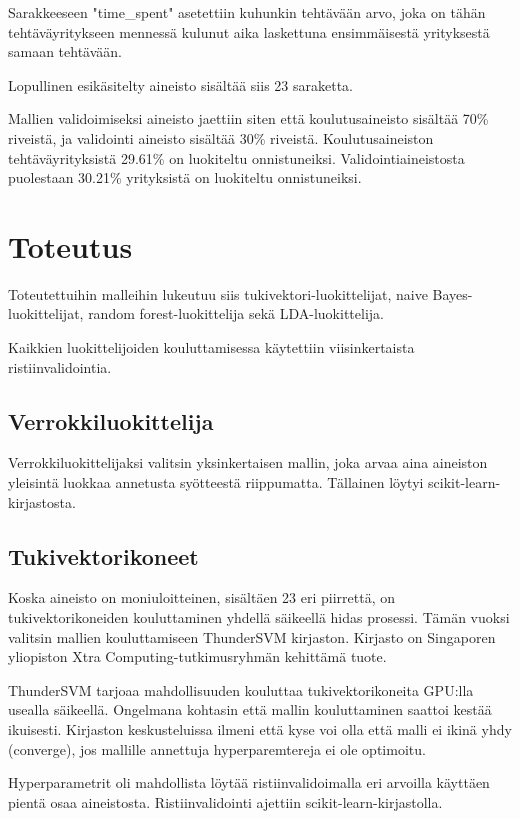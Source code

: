 \documentclass[finnish,twoside,openright]{HYgraduMLDS}
\begin{document}
Sarakkeeseen "time\_spent" asetettiin kuhunkin tehtävään arvo, joka on tähän tehtäväyritykseen mennessä kulunut aika laskettuna ensimmäisestä yrityksestä samaan tehtävään.

Lopullinen esikäsitelty aineisto sisältää siis 23 saraketta.

Mallien validoimiseksi aineisto jaettiin siten että koulutusaineisto sisältää 70\% riveistä, ja validointi aineisto sisältää 30\% riveistä. Koulutusaineiston tehtäväyrityksistä 29.61\% on luokiteltu onnistuneiksi. Validointiaineistosta puolestaan 30.21\% yrityksistä on luokiteltu onnistuneiksi.


\section{Toteutus}

Toteutettuihin malleihin lukeutuu siis tukivektori-luokittelijat, naive Bayes-luokittelijat, random forest-luokittelija sekä LDA-luokittelija.

Kaikkien luokittelijoiden kouluttamisessa käytettiin viisinkertaista ristiinvalidointia.

\subsection{Verrokkiluokittelija}

Verrokkiluokittelijaksi valitsin yksinkertaisen mallin, joka arvaa aina aineiston yleisintä luokkaa annetusta syötteestä riippumatta. Tällainen löytyi scikit-learn\cite{scikit-learn}-kirjastosta.


\subsection{Tukivektorikoneet}

Koska aineisto on moniuloitteinen, sisältäen 23 eri piirrettä, on tukivektorikoneiden kouluttaminen yhdellä säikeellä hidas prosessi. Tämän vuoksi valitsin mallien kouluttamiseen ThunderSVM\cite{wenthundersvm18} kirjaston. Kirjasto on Singaporen yliopiston Xtra Computing-tutkimusryhmän kehittämä tuote.

ThunderSVM tarjoaa mahdollisuuden kouluttaa tukivektorikoneita GPU:lla usealla säikeellä. Ongelmana kohtasin että mallin kouluttaminen saattoi kestää ikuisesti. Kirjaston keskusteluissa ilmeni että kyse voi olla että malli ei ikinä yhdy (converge), jos mallille annettuja hyperparemtereja ei ole optimoitu.

Hyperparametrit oli mahdollista löytää ristiinvalidoimalla eri arvoilla käyttäen pientä osaa aineistosta. Ristiinvalidointi ajettiin scikit-learn-kirjastolla\cite{scikit-learn}. 
\end{document}
